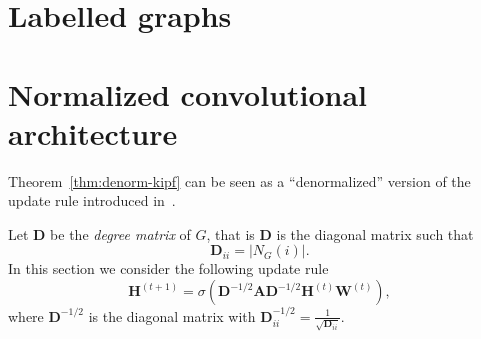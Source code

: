 \section{Labelled graphs}


\section{Normalized convolutional architecture}
Theorem~\ref{thm:denorm-kipf}
can be seen as a
``denormalized'' version of the update rule introduced
in~\cite{kipf-loose}.

Let $\mathbf{D}$ be the \emph{degree matrix} of $G$, that is $\mathbf{D}$
is the diagonal matrix such that
\[
    \mathbf{D}_{ii} = |N_G(i)|.
\]
In this section we consider the following update rule
\begin{equation}
    \mathbf{H}^{(t+1)} = \sigma\left(
        \mathbf{D}^{-1/2}\mathbf{A}\mathbf{D}^{-1/2}
        \mathbf{H}^{(t)}\mathbf{W}^{(t)}
    \right),
\end{equation}
where $\mathbf{D}^{-1/2}$
is the diagonal matrix with
$\mathbf{D}^{-1/2}_{ii} =
\frac{1}{\sqrt{\mathbf{D}_{ii}}}$.

